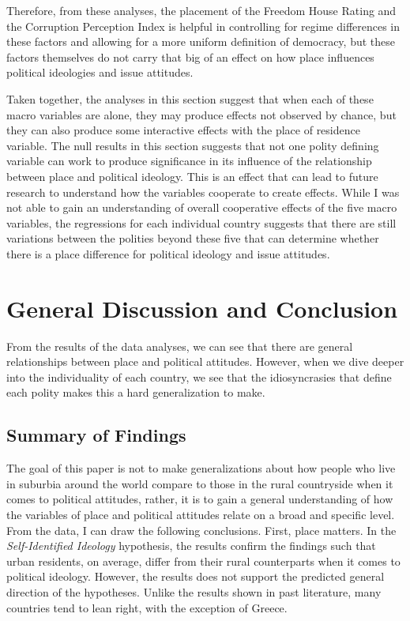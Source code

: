 \documentclass[12pt, titlepage]{article}
\newcommand\e{\emph}
\begin{document}
Therefore, from these analyses, the placement of the Freedom House Rating and the Corruption Perception Index is helpful in controlling for regime differences in these factors and allowing for a more uniform definition of democracy, but these factors themselves do not carry that big of an effect on how place influences political ideologies and issue attitudes. 

Taken together, the analyses in this section suggest that when each of these macro variables are alone, they may produce effects not observed by chance, but they can also produce some interactive effects with the place of residence variable. The null results in this section suggests that not one polity defining variable can work to produce significance in its influence of the relationship between place and political ideology. This is an effect that can lead to future research to understand how the variables cooperate to create effects. While I was not able to gain an understanding of overall cooperative effects of the five macro variables, the regressions for each individual country suggests that there are still variations between the polities beyond these five that can determine whether there is a place difference for political ideology and issue attitudes. 

\section{General Discussion and Conclusion}

From the results of the data analyses, we can see that there are general relationships between place and political attitudes. However, when we dive deeper into the individuality of each country, we see that the idiosyncrasies that define each polity makes this a hard generalization to make. 

\subsection{Summary of Findings}

The goal of this paper is not to make generalizations about how people who live in suburbia around the world compare to those in the rural countryside when it comes to political attitudes, rather, it is to gain a general understanding of how the variables of place and political attitudes relate on a broad and specific level. From the data, I can draw the following conclusions. First, place matters. In the \e{Self-Identified Ideology} hypothesis, the results confirm the findings such that urban residents, on average, differ from their rural counterparts when it comes to political ideology. However, the results does not support the predicted general direction of the hypotheses. Unlike the results shown in past literature, many countries tend to lean right, with the exception of Greece.
\end{document}
